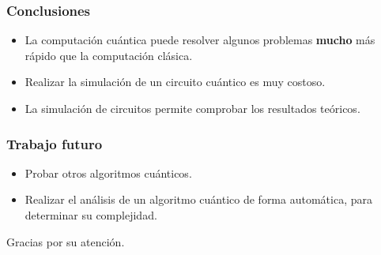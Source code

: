 \begin{frame}
\frametitle{Conclusiones}

\begin{itemize}
\item La computación cuántica puede resolver algunos problemas \textbf{mucho} 
más rápido que la computación clásica.
\item Realizar la simulación de un circuito cuántico es muy costoso.
\item La simulación de circuitos permite comprobar los resultados teóricos.
\end{itemize}

\end{frame}
\begin{frame}
\frametitle{Trabajo futuro}
\begin{itemize}
\item Probar otros algoritmos cuánticos.
\item Realizar el análisis de un algoritmo cuántico de forma automática, para 
determinar su complejidad.
\end{itemize}

\end{frame}
\begin{frame}
Gracias por su atención.
\end{frame}


